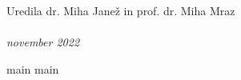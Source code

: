 \documentclass[graybox, envcountchap]{svmult}
\begin{document}
\large Uredila dr. Miha Janež in prof. dr. Miha Mraz\\
\\
\normalsize \emph{november 2022}




%
%



\tableofcontents
%
%


%
{main}
{main}

%

%
%



\backmatter





\end{document}
